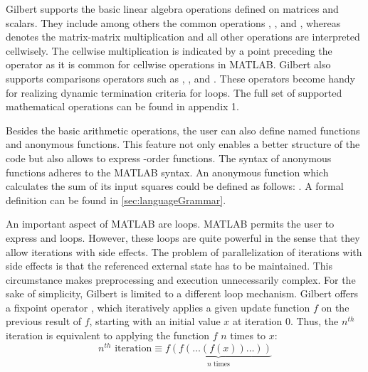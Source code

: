 Gilbert supports the basic linear algebra operations defined on matrices and scalars.
They include among others the common operations \code{+}, \code{-}, \code{/} and \code{*}, whereas \code{*} denotes the matrix-matrix multiplication and all other operations are interpreted cellwisely.
The cellwise multiplication is indicated by a point preceding the operator as it is common for cellwise operations in MATLAB.
Gilbert also supports comparisons operators such as \code{>}, \code{>=}, \code{==} and \code{\textasciitilde=}.
These operators become handy for realizing dynamic termination criteria for loops.
The full set of supported mathematical operations can be found in appendix 1.

Besides the basic arithmetic operations, the user can also define named functions and anonymous functions.
This feature not only enables a better structure of the code but also allows to express -order functions.
The syntax of anonymous functions adheres to the MATLAB syntax.
An anonymous function which calculates the sum of its input squares could be defined as follows: .
A formal definition can be found in \cref{sec:languageGrammar}.

An important aspect of MATLAB are loops.
MATLAB permits the user to express  and  loops.
However, these loops are quite powerful in the sense that they allow iterations with side effects.
The problem of parallelization of iterations with side effects is that the referenced external state has to be maintained.
This circumstance makes preprocessing and execution unnecessarily complex.
For the sake of simplicity, Gilbert is limited to a different loop mechanism.
Gilbert offers a fixpoint operator , which iteratively applies a given update function $f$ on the previous result of $f$, starting with an initial value $x$ at iteration $0$.
Thus, the $n^{th}$ iteration is equivalent to applying the function $f$ $n$ times to $x$: 
\begin{displaymath}
	n^{th}\text{ iteration}\equiv\underbrace{f(f(\ldots(f(x))\ldots))}_{\text{$n$ times}}
\end{displaymath}

